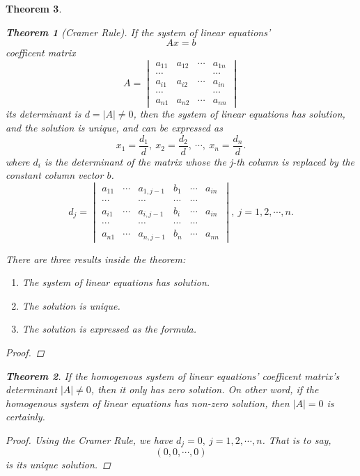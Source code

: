 \documentclass{article}
\newtheorem{theorem}{Theorem}[section]
\theoremstyle{definition}
\begin{document}
\begin{theorem}
\begin{theorem}[Cramer Rule]
    If the system of linear equations' 
    $$Ax=b$$
    coefficent matrix 
    $$
    A=
    \begin{vmatrix}
        a_{11} & a_{12} & \cdots & a_{1n}\\
        \cdots &  &  & \cdots\\
        a_{i1} & a_{i2} & \cdots & a_{in}\\
        \cdots &  &  & \cdots\\
        a_{n1} & a_{n2} & \cdots & a_{nn}
    \end{vmatrix}
    $$
    its determinant is $d = |A| \neq 0$, then the system of 
    linear equations has solution, and the solution is unique, and can be expressed as 
    $$x_{1}=\frac{d_{1}}{d},\ x_{2}=\frac{d_{2}}{d},\ \cdots,\ x_{n}=\frac{d_{n}}{d}.$$
    where $d_{i}$ is the determinant of the matrix whose the j-th column is replaced by 
    the constant column vector $b$.
    $$d_{j}=
    \begin{vmatrix}
        a_{11} & \cdots & a_{1,j-1} & b_{1} &\cdots & a_{in}\\
        \cdots &  & \cdots & \cdots & \cdots\\
        a_{i1} & \cdots & a_{i,j-1} & b_{i} &\cdots & a_{in}\\
        \cdots &  & \cdots & \cdots & \cdots\\
        a_{n1} & \cdots & a_{n,j-1} & b_{n} &\cdots & a_{nn}
    \end{vmatrix}
    ,\ j=1,2,\cdots,n.$$
\end{theorem}
There are three results inside the theorem:
\begin{enumerate}
    \item The system of linear equations has solution.
    \item The solution is unique.
    \item The solution is expressed as the formula.
\end{enumerate}

\begin{proof}
\end{proof}

\begin{theorem}
    If the homogenous system of linear equations' coefficent matrix's 
    determinant $|A|\neq 0$, then it only has zero solution. On other word, if 
    the homogenous system of linear equations has non-zero solution, then $|A|=0$ is certainly.
\end{theorem}
\begin{proof}
    Using the Cramer Rule, we have $d_{j}=0,\ j=1,2,\cdots,n$. That is to say,
    $$(0,0,\cdots,0)$$ is its unique solution.
\end{proof}



\end{theorem}
\end{document}
